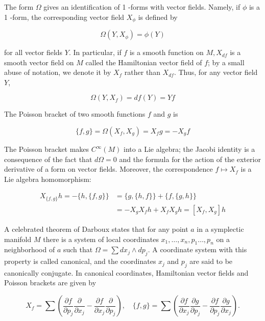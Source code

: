 \documentclass[10pt, letterpaper]{article}
\begin{document}
The form $\Omega$ gives an identification of 1 -forms with vector fields. Namely, if $\phi$ is a 1 -form, the corresponding vector field $X_{\phi}$ is defined by

$$
\Omega\left(Y, X_{\phi}\right)=\phi(Y)
$$

for all vector fields $Y$. In particular, if $f$ is a smooth function on $M, X_{d f}$ is a smooth vector field on $M$ called the Hamiltonian vector field of $f$; by a small abuse of notation, we denote it by $X_{f}$ rather than $X_{d f}$. Thus, for any vector field $Y$,

$$
\Omega\left(Y, X_{f}\right)=d f(Y)=Y f
$$

The Poisson bracket of two smooth functions $f$ and $g$ is

$$
\{f, g\}=\Omega\left(X_{f}, X_{g}\right)=X_{f} g=-X_{g} f
$$

The Poisson bracket makes $C^{\infty}(M)$ into a Lie algebra; the Jacobi identity is a consequence of the fact that $d \Omega=0$ and the formula for the action of the exterior derivative of a form on vector fields. Moreover, the correspondence $f \mapsto X_{f}$ is a Lie algebra homomorphism:

$$
\begin{aligned}
X_{\{f, g\}} h=-\{h,\{f, g\}\} & =\{g,\{h, f\}\}+\{f,\{g, h\}\} \\
& =-X_{g} X_{f} h+X_{f} X_{g} h=\left[X_{f}, X_{g}\right] h
\end{aligned}
$$

A celebrated theorem of Darboux states that for any point $a$ in a symplectic manifold $M$ there is a system of local coordinates $x_{1}, \ldots, x_{n}, p_{1} \ldots, p_{n}$ on a neighborhood of $a$ such that $\Omega=\sum d x_{j} \wedge d p_{j}$. A coordinate system with this property is called canonical, and the coordinates $x_{j}$ and $p_{j}$ are said to be canonically conjugate. In canonical coordinates, Hamiltonian vector fields and Poisson brackets are given by

$$
X_{f}=\sum\left(\frac{\partial f}{\partial p_{j}} \frac{\partial}{\partial x_{j}}-\frac{\partial f}{\partial x_{j}} \frac{\partial}{\partial p_{j}}\right), \quad\{f, g\}=\sum\left(\frac{\partial f}{\partial x_{j}} \frac{\partial g}{\partial p_{j}}-\frac{\partial f}{\partial p_{j}} \frac{\partial g}{\partial x_{j}}\right) .
$$
\end{document}
